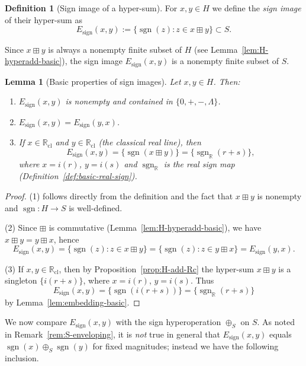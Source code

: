 \documentclass[11pt]{amsart}
\numberwithin{equation}{section}
\newtheorem{lemma}[theorem]{Lemma}
\theoremstyle{definition}
\newtheorem{definition}[theorem]{Definition}
\theoremstyle{remark}
\newcommand{\R}{\mathbb{R}}
\newcommand{\Rc}{\mathbb{R}_{\mathrm{cl}}} %
\newcommand{\Hnum}{H}                      %
\newcommand{\Sset}{S}                      %
\newcommand{\sgn}{\operatorname{sgn}}
\newcommand{\op}{\boxplus}                 %
\newcommand{\sop}{\oplus_S}                %
\newcommand{\iemb}{i}                      %
\begin{document}
\begin{definition}[Sign image of a hyper-sum]
\label{def:sign-image}
For $x,y\in\Hnum$ we define the \emph{sign image} of their hyper-sum as
\[
  E_{\mathrm{sign}}(x,y)
  := \{\sgn(z) : z\in x\op y\}\subset\Sset.
\]
\end{definition}

Since $x\op y$ is always a nonempty finite subset of $\Hnum$ (see
Lemma~\ref{lem:H-hyperadd-basic}), the sign image
$E_{\mathrm{sign}}(x,y)$ is a nonempty finite subset of $\Sset$.

\begin{lemma}[Basic properties of sign images]
\label{lem:sign-image-basic}
Let $x,y\in\Hnum$.  Then:
\begin{enumerate}
  \item $E_{\mathrm{sign}}(x,y)$ is nonempty and contained in
        $\{0,+,-,\Lambda\}$.
  \item $E_{\mathrm{sign}}(x,y) = E_{\mathrm{sign}}(y,x)$.
  \item If $x\in\Rc$ and $y\in\Rc$ (the classical real line), then
  \[
    E_{\mathrm{sign}}(x,y)
    = \{\sgn(x\op y)\}
    = \{\operatorname{sgn}_\R(r+s)\},
  \]
  where $x=\iemb(r)$, $y=\iemb(s)$ and $\operatorname{sgn}_\R$ is the
  real sign map (Definition~\ref{def:basic-real-sign}).
\end{enumerate}
\end{lemma}

\begin{proof}
(1) follows directly from the definition and the fact that $x\op y$ is
nonempty and $\sgn:\Hnum\to\Sset$ is well-defined.

(2) Since $\op$ is commutative (Lemma~\ref{lem:H-hyperadd-basic}), we
have $x\op y=y\op x$, hence
\[
  E_{\mathrm{sign}}(x,y)
  = \{\sgn(z): z\in x\op y\}
  = \{\sgn(z): z\in y\op x\}
  = E_{\mathrm{sign}}(y,x).
\]

(3) If $x,y\in\Rc$, then by Proposition~\ref{prop:H-add-Rc} the
hyper-sum $x\op y$ is a singleton $\{\iemb(r+s)\}$, where
$x=\iemb(r)$, $y=\iemb(s)$.  Thus
\[
  E_{\mathrm{sign}}(x,y)
  = \{\sgn(\iemb(r+s))\}
  = \{\operatorname{sgn}_\R(r+s)\}
\]
by Lemma~\ref{lem:embedding-basic}.
\end{proof}

We now compare $E_{\mathrm{sign}}(x,y)$ with the sign hyperoperation
$\sop$ on $\Sset$.  As noted in Remark~\ref{rem:S-enveloping}, it is
\emph{not} true in general that $E_{\mathrm{sign}}(x,y)$ equals
$\sgn(x)\sop\sgn(y)$ for fixed magnitudes; instead we have the
following inclusion.
\end{document}
